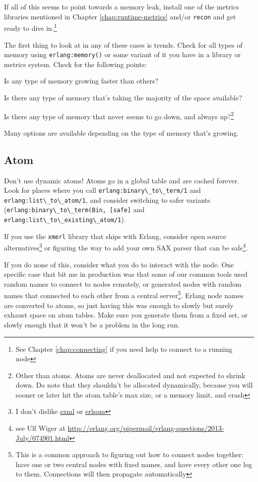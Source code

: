 \documentclass[11pt, oneside]{book}   	%
\newcommand{\otpapp}[1]{\Verb`#1`}
\newcommand{\function}[1]{\Verb`#1`}
\newcommand{\expression}[1]{\Verb`#1`}
\begin{document}
If all of this seems to point towards a memory leak, install one of the metrics libraries mentioned in Chapter \ref{chap:runtime-metrics} and/or \otpapp{recon} and get ready to dive in.\footnote{See Chapter \ref{chap:connecting} if you need help to connect to a running node}

The first thing to look at in any of these cases is trends. Check for all types of memory using \expression{erlang:memory()} or some variant of it you have in a library or metrics system. Check for the following points:

\begin{itemize*}
	\item Is any type of memory growing faster than others?
	\item Is there any type of memory that's taking the majority of the space available?
	\item Is there any type of memory that never seems to go down, and always up?\footnote{Other than atoms. Atoms are never deallocated and not expected to shrink down. Do note that they shouldn't be allocated dynamically, because you will sooner or later hit the atom table's max size, or a memory limit, and crash}
\end{itemize*}

Many options are available depending on the type of memory that's growing.

\subsection{Atom}

Don't use dynamic atoms! Atoms go in a global table and are cached forever. Look for places where you call \function{erlang:binary\_to\_term/1} and \function{erlang:list\_to\_atom/1}, and consider switching to safer variants (\expression{erlang:binary\_to\_term(Bin, [safe]} and \function{erlang:list\_to\_existing\_atom/1}).

If you use the \otpapp{xmerl} library that ships with Erlang, consider open source alternatives\footnote{I don't dislike \href{https://github.com/paulgray/exml}{exml} or \href{https://github.com/willemdj/erlsom}{erlsom}} or figuring the way to add your own SAX parser that can be safe\footnote{see Ulf Wiger at \href{http://erlang.org/pipermail/erlang-questions/2013-July/074901.html}{http://erlang.org/pipermail/erlang-questions/2013-July/074901.html}}. 

If you do none of this, consider what you do to interact with the node. One specific case that bit me in production was that some of our common tools used random names to connect to nodes remotely, or generated nodes with random names that connected to each other from a central server\footnote{This is a common approach to figuring out how to connect nodes together: have one or two central nodes with fixed names, and have every other one log to them. Connections will then propagate automatically}. Erlang node names are converted to atoms, so just having this was enough to slowly but surely exhaust space on atom tables. Make sure you generate them from a fixed set, or slowly enough that it won't be a problem in the long run.
\end{document}
